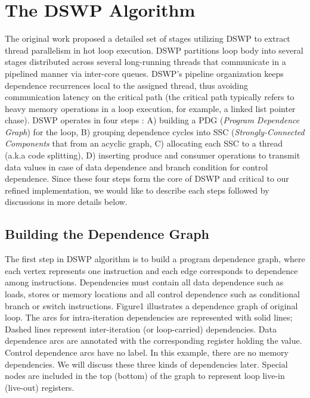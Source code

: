 \documentclass[letterpaper, 10 pt, conference]{ieeeconf}  %
\begin{document}
\section{The DSWP Algorithm}
The original work \cite{c3} proposed a detailed set of stages utilizing DSWP to extract thread parallelism in hot loop execution. DSWP partitions loop body into several stages distributed across several long-running threads that communicate in a pipelined manner via inter-core queues. DSWP's pipeline organization keeps dependence recurrences local to the assigned thread, thus avoiding communication latency on the critical path (the critical path typically refers to heavy memory operations in a loop execution, for example, a linked list pointer chase). DSWP operates in four steps \cite{c3}: A) building a PDG (\textit{Program Dependence Graph}) for the loop, B) grouping dependence cycles into SSC (\textit{Strongly-Connected Components} that from an acyclic graph, C) allocating each SSC to a thread (a.k.a code splitting), D) inserting produce and consumer operations to transmit data values in case of data dependence and branch condition for control dependence. Since these four steps form the core of DSWP and critical to our refined implementation, we would like to describe each steps followed by discussions in more details below.




\subsection{Building the Dependence Graph}
The first step in DSWP algorithm is to build a program dependence graph, where each vertex represents one instruction and each edge corresponds to dependence among instructions. Dependencies must  contain all data dependence such as loads, stores or memory locations and all control dependence such as conditional branch or switch instructions. Figure1 illustrates a dependence graph of original loop. The arcs for intra-iteration dependencies are represented with solid lines; Dashed lines represent inter-iteration (or loop-carried) dependencies. Data dependence arcs are annotated with the corresponding register holding the value. Control dependence arcs have no label. In this example, there are no memory dependencies. We will discuss these three kinds of dependencies later. Special nodes are included in the top (bottom) of the graph to represent loop live-in (live-out) registers.
\end{document}
